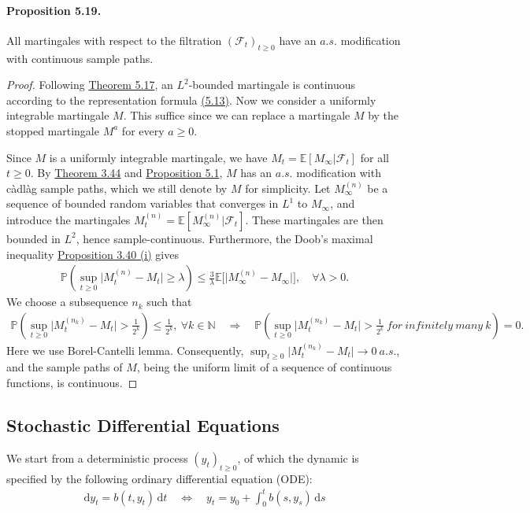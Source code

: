 \documentclass{article}
\numberwithin{equation}{section}
\newcommand{\E}{\mathbb{E}}
\renewcommand{\P}{\mathbb{P}}
\renewcommand{\d}{\mathrm{d}}
\theoremstyle{plain}
\theoremstyle{definition}
\begin{document}
\paragraph{Proposition 5.19.\label{prop:5.19}} All martingales with respect to the filtration $(\mathscr{F}_t)_{t\geq 0}$ have an $a.s.$ modification with continuous sample paths.
\begin{proof}
Following \hyperref[thm:5.17]{Theorem 5.17}, an $L^2$-bounded martingale is continuous according to the representation formula \hyperref[eq:5.13]{(5.13)}. Now we consider a uniformly integrable martingale $M$. This suffice since we can replace a martingale $M$ by the stopped martingale $M^a$ for every $a\geq 0$.

Since $M$ is a uniformly integrable martingale, we have $M_t=\E[M_\infty|\mathscr{F}_t]$ for all $t\geq 0$. By \hyperref[thm:3.44]{Theorem 3.44} and \hyperref[prop:5.18]{Proposition 5.1}, $M$ has an $a.s.$ modification with càdlàg sample paths, which we still denote by $M$ for simplicity. Let $M_\infty^{(n)}$ be a sequence of bounded random variables that converges in $L^1$ to $M_\infty$, and introduce the martingales $M^{(n)}_t=\E[M^{(n)}_\infty|\mathscr{F}_t]$. These martingales are then bounded in $L^2$, hence sample-continuous. Furthermore, the Doob's maximal inequality \hyperref[prop:3.40]{Proposition 3.40 (i)} gives
\begin{align*}
	\P\left(\sup_{t\geq 0}\vert M^{(n)}_t-M_t\vert\geq\lambda\right)\leq\frac{3}{\lambda}\E\bigl[\vert M_\infty^{(n)}-M_\infty\vert\bigr],\quad\forall\lambda>0.
\end{align*}
We choose a subsequence $n_k$ such that
\begin{align*}
	\P\left(\sup_{t\geq 0}\vert M^{(n_k)}_t-M_t\vert > \frac{1}{2^k}\right)\leq \frac{1}{2^k},\ \forall k\in\mathbb{N}\quad\Rightarrow\quad \P\left(\sup_{t\geq 0}\vert M^{(n_k)}_t-M_t\vert >\frac{1}{2^k}\ for\ infinitely\ many\ k\right)=0.
\end{align*}
Here we use Borel-Cantelli lemma. Consequently, $\sup_{t\geq 0}\vert M^{(n_k)}_t-M_t\vert\to 0\ a.s.$, and the sample paths of $M$, being the uniform limit of a sequence of continuous functions, is continuous.
\end{proof}

\newpage
\subsection{Stochastic Differential Equations}
We start from a deterministic process $(y_t)_{t\geq 0}$, of which the dynamic is specified by the following ordinary differential equation (ODE):
\begin{align*}
	\d y_t = b(t,y_t)\,\d t\quad\Leftrightarrow\quad y_t = y_0 + \int_0^t b(s,y_s)\,\d s 
\end{align*}
\end{document}
